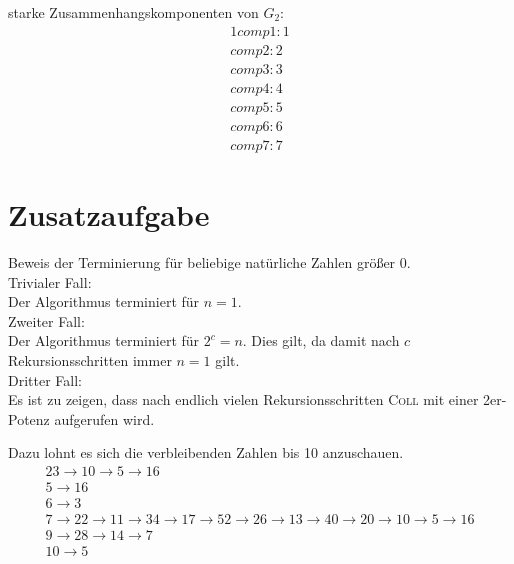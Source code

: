 \documentclass[10pt,a4paper,oneside,ngerman,numbers=noenddot]{scrartcl}
\begin{document}
		starke Zusammenhangskomponenten von $G_{2}:$
		\begin{alignat*}{1}
			comp1: 1 \\
			comp2: 2 \\
			comp3: 3 \\
			comp4: 4 \\
			comp5: 5 \\
			comp6: 6 \\
			comp7: 7
		\end{alignat*}
\section{} %
	\subsection{} %
	\subsection{} %
	\subsection{} %
	
\section*{Zusatzaufgabe} %
		
	Beweis der Terminierung für beliebige natürliche Zahlen größer $0$.\\
	Trivialer Fall: \\
	Der Algorithmus terminiert für $n=1$. \\
	Zweiter Fall: \\
	Der Algorithmus terminiert für $2^{c} = n$. Dies gilt, da damit nach $c$ Rekursionsschritten immer $n=1$ gilt. \\
	Dritter Fall: \\
	Es ist zu zeigen, dass nach endlich vielen Rekursionsschritten \textsc{Coll} mit einer 2er-Potenz aufgerufen wird.
	
	Dazu lohnt es sich die verbleibenden Zahlen bis 10 anzuschauen.
	\begin{alignat*}{2}
		3 \rightarrow 10 \rightarrow 5 \rightarrow 16 \\
		5 \rightarrow 16 \\
		6 \rightarrow 3 \\
		7 \rightarrow 22 \rightarrow 11 \rightarrow 34 \rightarrow 17 \rightarrow 52 \rightarrow 26 \rightarrow 13 \rightarrow 40 \rightarrow 20 \rightarrow 10 \rightarrow 5 \rightarrow 16 \\
		9 \rightarrow 28 \rightarrow 14 \rightarrow 7 \\
		10 \rightarrow 5
	\end{alignat*}
	
\end{document}
